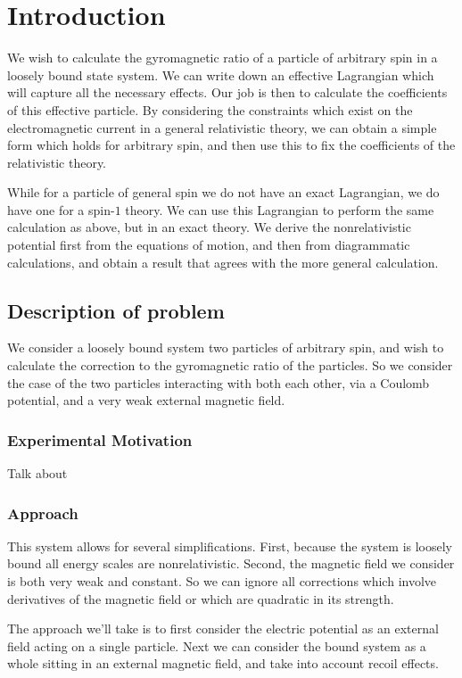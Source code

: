 \section{Introduction}
We wish to calculate the gyromagnetic ratio of a particle of arbitrary spin in a loosely bound state system.  We can write down an effective Lagrangian which will capture all the necessary effects.  Our job is then to calculate the coefficients of this effective particle.  By considering the constraints which exist on the electromagnetic current in a general relativistic theory, we can obtain a simple form which holds for arbitrary spin, and then use this to fix the coefficients of the relativistic theory.

While for a particle of general spin we do not have an exact Lagrangian, we do have one for a spin-$1$ theory.  We can use this Lagrangian to perform the same calculation as above, but in an exact theory.  We derive the nonrelativistic potential first from the equations of motion, and then from diagrammatic calculations, and obtain a result that agrees with the more general calculation.  
\subsection{Description of problem}
We consider a loosely bound system two particles of arbitrary spin, and wish to calculate the correction to the gyromagnetic ratio of the particles.  So we consider the case of the two particles interacting with both each other, via a Coulomb potential, and a very weak external magnetic field.
\subsubsection{Experimental Motivation}

Talk about 


\subsubsection{Approach}
This system allows for several simplifications.  First, because the system is loosely bound all energy scales are nonrelativistic.  
Second, the magnetic field we consider is both very weak and constant.  So we can ignore all corrections which involve derivatives of the magnetic field or which are quadratic in its strength.

The approach we'll take is to first consider the electric potential as an external field acting on a single particle.  Next we can consider the bound system as a whole sitting in an external magnetic field, and take into account recoil effects.

